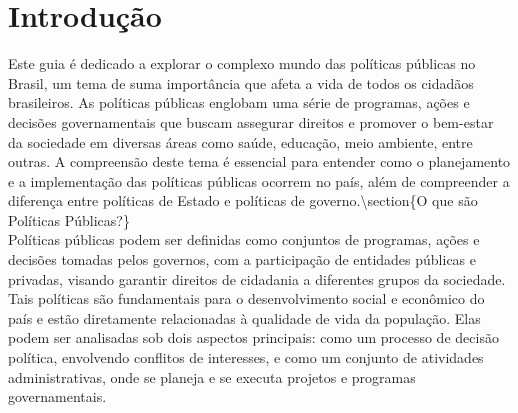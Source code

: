 \documentclass[
   article,       
   12pt,          
   oneside,       
   a4paper,       
   english,       
   brazil,        
   sumario=tradicional
   ]{abntex2}
\begin{document}
\section{Introdução}
Este guia é dedicado a explorar o complexo mundo das políticas públicas no Brasil, um tema de suma importância que afeta a vida de todos os cidadãos brasileiros. As políticas públicas englobam uma série de programas, ações e decisões governamentais que buscam assegurar direitos e promover o bem-estar da sociedade em diversas áreas como saúde, educação, meio ambiente, entre outras. A compreensão deste tema é essencial para entender como o planejamento e a implementação das políticas públicas ocorrem no país, além de compreender a diferença entre políticas de Estado e políticas de governo.\textbackslash{}section\{O que são Políticas Públicas?\}\\Políticas públicas podem ser definidas como conjuntos de programas, ações e decisões tomadas pelos governos, com a participação de entidades públicas e privadas, visando garantir direitos de cidadania a diferentes grupos da sociedade. Tais políticas são fundamentais para o desenvolvimento social e econômico do país e estão diretamente relacionadas à qualidade de vida da população. Elas podem ser analisadas sob dois aspectos principais: como um processo de decisão política, envolvendo conflitos de interesses, e como um conjunto de atividades administrativas, onde se planeja e se executa projetos e programas governamentais.
\end{document}
